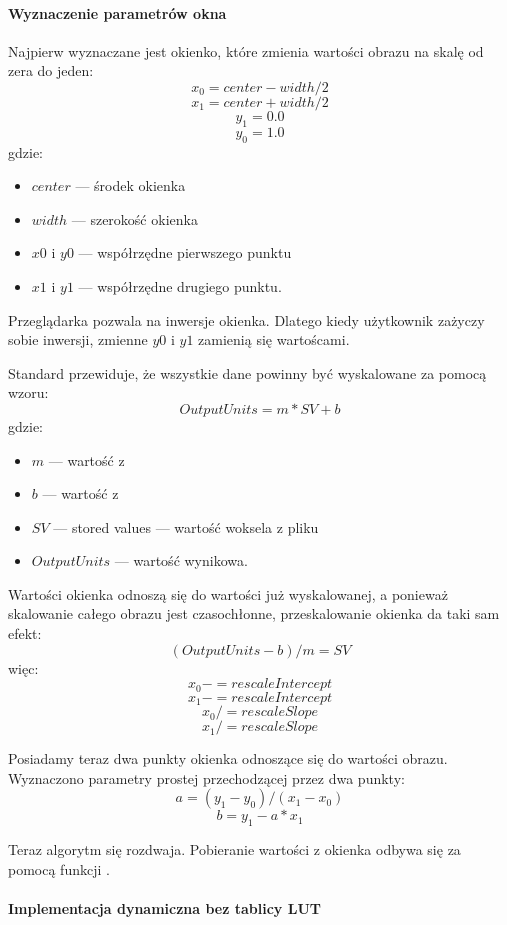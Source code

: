 \paragraph{Wyznaczenie parametrów okna}
\par
Najpierw wyznaczane jest  okienko, które zmienia wartości obrazu na skalę od zera do jeden:
\[x_0 = center - width / 2\]
\[x_1 = center + width / 2\]
\[y_1 = 0.0\]
\[y_0 = 1.0\]
gdzie:
\begin{itemize}
    \item $center$ --- środek okienka
    \item $width$ --- szerokość okienka
    \item $x0$ i $y0$ --- współrzędne pierwszego punktu
    \item $x1$ i $y1$ --- współrzędne drugiego punktu.
\end{itemize}
Przeglądarka pozwala na inwersje okienka.
Dlatego kiedy użytkownik zażyczy sobie inwersji, zmienne $y0$ i $y1$ zamienią się wartoścami.

Standard \DICOM przewiduje, że wszystkie dane powinny być wyskalowane za pomocą wzoru:
\[OutputUnits = m*SV + b\]
gdzie:
\begin{itemize}
    \item $m$ --- wartość z 
    \item $b$ --- wartość z 
    \item $SV$ --- stored values --- wartość woksela z pliku
    \item $OutputUnits$ --- wartość wynikowa.
\end{itemize}

Wartości okienka odnoszą się do wartości już wyskalowanej, a ponieważ skalowanie całego obrazu jest czasochłonne, przeskalowanie okienka da taki sam efekt:
\[(OutputUnits - b ) / m = SV \]
więc:
\[x_0 -= rescaleIntercept\]
\[x_1 -= rescaleIntercept\]
\[x_0 /= rescaleSlope\]
\[x_1 /= rescaleSlope\]

Posiadamy teraz dwa punkty okienka odnoszące się do wartości obrazu.
Wyznaczono parametry prostej przechodzącej przez dwa punkty:
\[a = (y_1 - y_0) / (x_1 - x_0)\]
\[b = y_1 - a * x_1\]

\par
Teraz algorytm się rozdwaja.
Pobieranie wartości z okienka odbywa się za pomocą funkcji .

\paragraph{Implementacja dynamiczna bez tablicy LUT}

